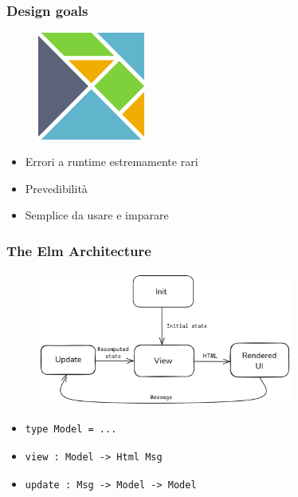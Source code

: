 \documentclass{beamer}
\begin{document}
\begin{frame}
  \frametitle{Design goals}
  \begin{figure}
    \centering
    \includegraphics[height=100pt]{assets/elm-logo.png}
  \end{figure}
  \begin{itemize}
      \item Errori a runtime estremamente rari
      \item Prevedibilità
      \item Semplice da usare e imparare
  \end{itemize}
\end{frame}

\begin{frame}[containsverbatim]
  \frametitle{The Elm Architecture}
  \begin{figure}
    \centering
    \includegraphics[height=125pt]{assets/elm-architecture.png}
  \end{figure}
  \begin{itemize}
      \item\begin{verbatim}
type Model = ...
      \end{verbatim}
      \item\begin{verbatim}
view : Model -> Html Msg
      \end{verbatim}
      \item\begin{verbatim}
update : Msg -> Model -> Model
      \end{verbatim}
  \end{itemize}

\end{frame}
\end{document}

